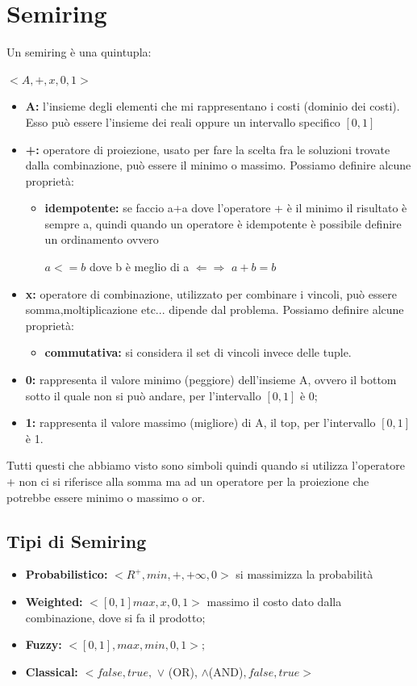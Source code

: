 \section{Semiring}
Un semiring è una quintupla:
\begin{center}
    $<A, +, x, 0, 1>$
\end{center}
\begin{itemize}
    \item \textbf{A:} l’insieme degli elementi che mi rappresentano i costi (dominio dei costi). Esso può essere l’insieme dei reali oppure un intervallo specifico $[0,1]$
    \item \textbf{+:} operatore di proiezione, usato per fare la scelta fra le soluzioni trovate dalla combinazione, può essere il minimo o massimo. Possiamo definire alcune proprietà:
    \begin{itemize}
        \item \textbf{idempotente:} se faccio a+a dove l’operatore + è il minimo il risultato è sempre a, quindi quando un operatore è idempotente è possibile definire un ordinamento ovvero
        \begin{center}
            $a <= b$ dove b è meglio di a $\Leftarrow \Rightarrow$ $a + b = b$
        \end{center}
    \end{itemize}
    \item \textbf{x:} operatore di combinazione, utilizzato per combinare i vincoli, può essere somma,moltiplicazione etc... dipende dal problema. Possiamo definire alcune proprietà:
    \begin{itemize}
        \item \textbf{commutativa:} si considera il set di vincoli invece delle tuple.
    \end{itemize}
    \item \textbf{0:} rappresenta il valore minimo (peggiore) dell’insieme A, ovvero il bottom sotto il quale non si può andare, per l’intervallo $[0,1]$ è 0;
    \item \textbf{1:} rappresenta il valore massimo (migliore) di A, il top, per l’intervallo $[0,1]$ è 1.
\end{itemize}
Tutti questi che abbiamo visto sono simboli quindi quando si utilizza l’operatore $+$ non ci si riferisce alla somma ma ad un operatore per la proiezione che potrebbe essere minimo o massimo o or.
\subsection{Tipi di Semiring}
\begin{itemize}
    \item \textbf{Probabilistico:} $< R^+ , min, +, +\infty, 0>$ si massimizza la probabilità
    \item \textbf{Weighted:} $<[0, 1] max,x,0,1>$ massimo il costo dato dalla combinazione, dove si fa il prodotto;
    \item \textbf{Fuzzy:} $<[0,1],max,min,0,1>;$
    \item \textbf{Classical:} $<{false,true},$ $\lor$ (OR), $\land$(AND)$, false, true>$
\end{itemize}

